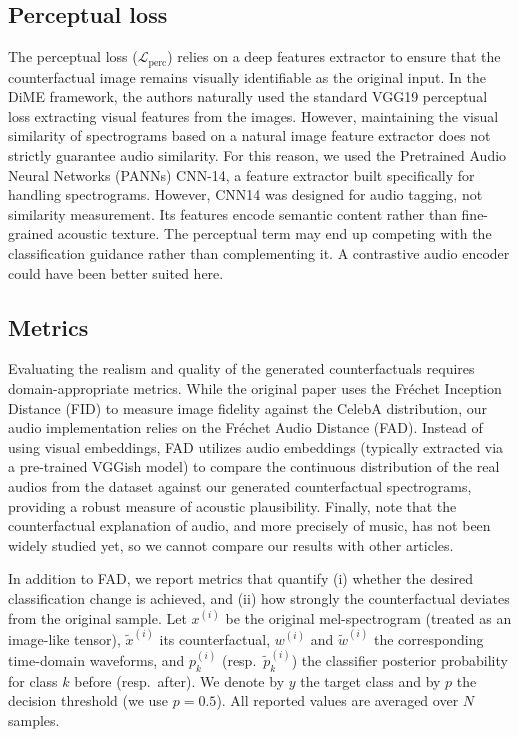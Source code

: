 \documentclass[11pt]{article}
\begin{document}
\subsection{Perceptual loss}
The perceptual loss ($\mathcal{L}_{\text{perc}}$) relies on a deep
features extractor to ensure that the counterfactual image remains
visually identifiable as the original input. In the DiME framework,
the authors naturally used the standard VGG19 perceptual loss
extracting visual features from the images. However, maintaining the
visual similarity of spectrograms based on a natural image feature
extractor does not strictly guarantee audio similarity. For this
reason, we used the Pretrained Audio Neural Networks (PANNs) CNN-14,
a feature extractor built specifically for handling spectrograms.
However, CNN14 was designed for audio tagging, not similarity
measurement. Its features encode semantic content rather than
fine-grained acoustic texture. The perceptual term may end up
competing with the classification guidance rather than complementing
it. A contrastive audio encoder could have been better suited here.

\subsection{Metrics}
\label{sec:metrics}
Evaluating the realism and quality of the generated counterfactuals
requires domain-appropriate metrics. While the original paper uses
the Fréchet Inception Distance (FID) to measure image fidelity
against the CelebA distribution, our audio implementation relies on
the Fréchet Audio Distance (FAD). Instead of using visual embeddings,
FAD utilizes audio embeddings (typically extracted via a pre-trained
VGGish model) to compare the continuous distribution of the real
audios from the dataset against our generated counterfactual
spectrograms, providing a robust measure of acoustic plausibility.
Finally, note that the counterfactual explanation of audio, and more
precisely of music, has not been widely studied yet, so we cannot
compare our results with other articles.

In addition to FAD, we report metrics that quantify (i) whether the
desired classification change is achieved, and (ii) how strongly the
counterfactual deviates from the original sample. Let $x^{(i)}$ be the
original mel-spectrogram (treated as an image-like tensor), $\tilde{x}^{(i)}$
its counterfactual, $w^{(i)}$ and $\tilde{w}^{(i)}$ the corresponding
time-domain waveforms, and $p^{(i)}_k$ (resp.\ $\tilde{p}^{(i)}_k$) the
classifier posterior probability for class $k$ before (resp.\ after).
We denote by $y$ the target class and by $p$ the decision threshold
(we use $p=0.5$). All reported values are averaged over $N$ samples.
\end{document}
